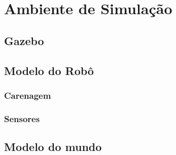 \documentclass[../delivery_hospital_report.tex]{subfiles}
\begin{document}
\chapter{Ambiente de Simulação}
\section{Gazebo}
\section{Modelo do Robô}
\subsection{Carenagem}
\subsection{Sensores}
\section{Modelo do mundo}
\end{document}
